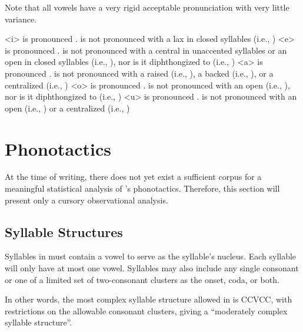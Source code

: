 Note that all \langtvk{} vowels have a very rigid acceptable pronunciation with very little variance.

	   is pronounced .  is not pronounced with a lax  in closed syllables (i.e., )
	   is pronounced .  is not pronounced with a central  in unaccented syllables or an open  in closed syllables (i.e., ), nor is it diphthongized to  (i.e., )
	   is pronounced .  is not pronounced with a raised  (i.e., ), a backed  (i.e., ), or a centralized  (i.e., )
	   is pronounced .  is not pronounced with an open  (i.e., ), nor is it diphthongized to  (i.e., )
	   is pronounced .  is not pronounced with an open  (i.e., ) or a centralized  (i.e., )
\xe

\section{Phonotactics}
\label{sec:tvk-phonotactics}

At the time of writing, there does not yet exist a sufficient corpus for a meaningful statistical analysis of \langtvk's phonotactics. Therefore, this section will present only a cursory observational analysis.

\subsection{Syllable Structures}
\label{subsec:tvk-syll-struc}

Syllables in \langtvk{} must contain a vowel to serve as the syllable's nucleus. Each syllable will only have at most one vowel. Syllables may also include any single consonant or one of a limited set of two-consonant clusters as the onset, coda, or both.

In other words, the most complex syllable structure allowed in \langtvk{} is CCVCC, with restrictions on the allowable consonant clusters, giving \langtvk{} a \enquote{moderately complex syllable structure}.\autocite{wals-12}

